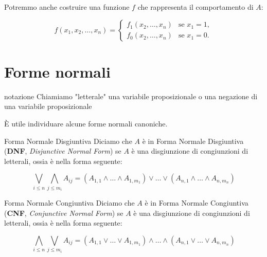 \documentclass[a4paper,11pt]{report}
\begin{document}
\begin{proofbox}[title=dimostrazione]
\begin{itemize}
\begin{itemize}
            \begin{gbox}{}
                Potremmo anche costruire una funzione \( f \) che rappresenta il comportamento di \( A \):

                \[ f(x_1, x_2, \ldots, x_n) =
                    \begin{cases}
                        f_1(x_2, \ldots, x_n) & \text{se } x_1 = 1, \\
                        f_0(x_2, \ldots, x_n) & \text{se } x_1 = 0.
                    \end{cases}
                \]
            \end{gbox}

    \end{itemize}

\end{itemize}

\end{proofbox}

\section{Forme normali}

\begin{gbox}{notazione}
    Chiamiamo "letterale" una variabile proposizionale o una negazione di una variabile proposizionale
\end{gbox}

È utile individuare alcune forme normali canoniche.

\begin{defbox}{Forma Normale Disgiuntiva}{}
    Diciamo che \( A \) è in Forma Normale Disgiuntiva (\textbf{DNF}, \textit{Disjunctive Normal Form}) se \( A \) è una disgiunzione di congiunzioni di letterali, ossia è nella forma seguente:

    \[ \bigvee_{i\leq n} \bigwedge_{j\leq m_i} A_{ij} = (A_{1,1} \land \dots \land A_{1, m_1}) \lor \dots \lor (A_{n,1} \land \dots \land A_{n, m_n}) \]

\end{defbox}

\begin{defbox}{Forma Normale Congiuntiva}{}
    Diciamo che \( A \) è in Forma Normale Congiuntiva (\textbf{CNF}, \textit{Conjunctive Normal Form}) se \( A \) è una disgiunzione di congiunzioni di letterali, ossia è nella forma seguente:

    \[ \bigwedge_{i\leq n} \bigvee_{j\leq m_i} A_{ij} = (A_{1,1} \lor \dots \lor A_{1, m_1}) \land \dots \land (A_{n,1} \lor \dots \lor A_{n, m_n}) \]

\end{defbox}
\end{document}
